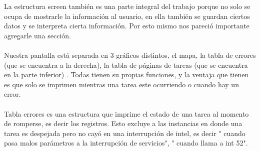 La estructura screen tambi\'en es una parte integral del trabajo porque no solo se ocupa de mostrarle
la informaci\'on al usuario, en ella tambi\'en se guardan ciertos datos y se interpreta cierta informaci\'on.
Por esto mismo nos pareci\'o importante agregarle una secci\'on.\\
\\
Nuestra pantalla est\'a separada en 3 gr\'aficos distintos, el mapa, la tabla de errores (que se encuentra a la derecha), la tabla de p\'aginas de tareas (que se encuentra en la parte inferior) . Todas tienen su propias funciones, y la ventaja que tienen es que solo se imprimen mientras una tarea este ocurriendo o cuando hay un error.\\
\\
Tabla errores es una estructura que imprime el estado de una tarea al momento de romperse, es decir los registros. Esto excluye a las instancias en donde una tarea es despejada pero no cay\'o en una interrupci\'on de intel, es decir " cuando pasa malos par\'ametros a la interrupci\'on de servicios", " cuando llama a int 52". \\
\\

